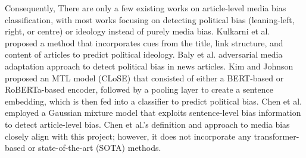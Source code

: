 Consequently, There are only a few existing works on article-level media bias classification, with most works focusing on detecting political bias (leaning-left, right, or centre) or ideology instead of purely media bias. Kulkarni et al. \cite{kulkarni-2018-multi-view} proposed a method that incorporates cues from the title, link structure, and content of articles to predict political ideology. Baly et al. \cite{baly-2020-we-can-detect-your-bias} adversarial media adaptation approach to detect political bias in news articles. Kim and Johnson \cite{kim-johnson-2022-close} proposed an MTL model (CLoSE) that consisted of either a BERT-based or RoBERTa-based encoder, followed by a pooling layer to create a sentence embedding, which is then fed into a classifier to predict political bias. Chen et al. \cite{chen-2020-detecting-media-bias-gaussian} employed a Gaussian mixture model that exploits sentence-level bias information to detect article-level bias. Chen et al.'s definition and approach to media bias closely align with this project; however, it does not incorporate any transformer-based or state-of-the-art (SOTA) methods.







